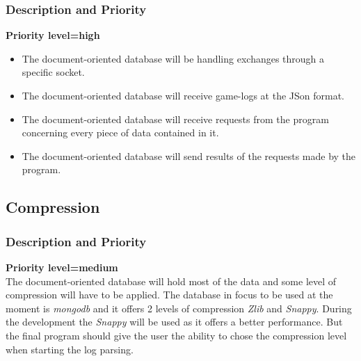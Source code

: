 \documentclass{scrreprt}
\begin{document}
\subsubsection{Description and Priority}
\textbf{Priority level=high}\\
\begin{itemize}
\item The document-oriented database will be handling exchanges through a specific socket.
\item The document-oriented database will receive game-logs at the JSon format.
\item The document-oriented database will receive requests from the program concerning every piece of data contained in it.
\item The document-oriented database will send results of the requests made by the program.
\end{itemize}


\subsection{Compression}
\subsubsection{Description and Priority}
\textbf{Priority level=medium}\\
The document-oriented database will hold most of the data and some level of compression
will have to be applied.
The database in focus to be used at the moment is \textit{mongodb} and it offers
2 levels of compression \textit{Zlib} and \textit{Snappy}.
During the development the \textit{Snappy} will be used as it offers a better
performance.
But the final program should give the user the ability to chose the compression
level when starting the log parsing.
\end{document}
